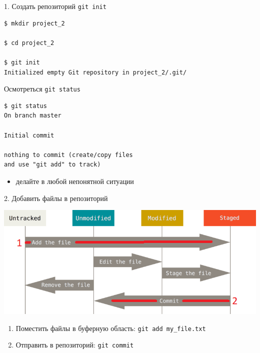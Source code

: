 \documentclass[presentation]{beamer}
\begin{document}
\begin{frame}[fragile,label={sec:org6ba3b26}]{1. Создать репозиторий}
 \alert{\texttt{git init}}

\begin{verbatim}
$ mkdir project_2

$ cd project_2

$ git init
Initialized empty Git repository in project_2/.git/
\end{verbatim}
\end{frame}

\begin{frame}[fragile,label={sec:org66b5218}]{ Осмотреться}
 \alert{\texttt{git status}}

\begin{verbatim}
$ git status
On branch master

Initial commit

nothing to commit (create/copy files 
and use "git add" to track)
\end{verbatim}

\begin{itemize}
\item делайте в любой непонятной ситуации
\end{itemize}
\end{frame}

\begin{frame}[fragile,label={sec:org611fc3b}]{2. Добавить файлы в репозиторий}
 \begin{center}
\includegraphics[height=0.5\textheight]{./01_vcs_01_git_file_states_01_add.png}
\end{center}

\begin{enumerate}
\item Поместить файлы в буферную область: \texttt{git add my\_file.txt}
\item Отправить в репозиторий: \texttt{git commit}
\end{enumerate}
\end{frame}
\end{document}
